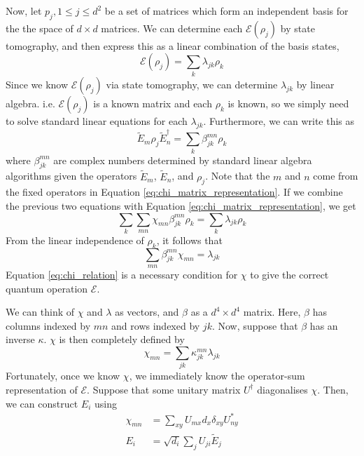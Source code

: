 Now, let $p_j, 1 \le j \le d^2$ be a set of matrices which form an independent basis for the the
space of $d \times d$ matrices. We can determine each $\mathcal{E}(\rho_j)$ by state tomography, and
then express this as a linear combination of the basis states,
\begin{equation}
    \mathcal{E}(\rho_j) = \sum_k \lambda_{jk} \rho_k
\end{equation}
Since we know $\mathcal{E}(\rho_j)$ via state tomography, we can determine $\lambda_{jk}$ by linear
algebra. i.e. $\mathcal{E}(\rho_j)$ is a known matrix and each $\rho_k$ is known, so we simply need
to solve standard linear equations for each $\lambda_{jk}$. Furthermore, we can write this as
\begin{equation}
    \tilde{E}_m \rho_j \tilde{E}_n^{\dagger} = \sum_k \beta_{jk}^{mn} \rho_k
\end{equation}
where $\beta_{jk}^{mn}$ are complex numbers determined by standard linear algebra algorithms given
the operators $\tilde{E}_m$, $\tilde{E}_n$, and $\rho_j$. Note that the $m$ and $n$ come from the fixed operators in
Equation \ref{eq:chi_matrix_representation}. If we combine the previous two equations with Equation
\ref{eq:chi_matrix_representation}, we get
\begin{equation}
    \sum_k \sum_{mn} \chi_{mn} \beta_{jk}^{mn} \rho_k = \sum_k \lambda_{jk} \rho_k
\end{equation}
From the linear independence of $\rho_k$, it follows that
\begin{equation} \label{eq:chi_relation}
    \sum_{mn} \beta_{jk}^{mn} \chi_{mn} = \lambda_{jk}
\end{equation}
Equation \ref{eq:chi_relation} is a necessary condition for $\chi$ to give the correct quantum
operation $\mathcal{E}$.

We can think of $\chi$ and $\lambda$ as vectors, and $\beta$ as a $d^4 \times d^4$ matrix. Here,
$\beta$ has columns indexed by $mn$ and rows indexed by $jk$. Now, suppose that $\beta$ has an
inverse $\kappa$. $\chi$ is then completely defined by
\begin{equation}
    \chi_{mn} = \sum_{jk} \kappa_{jk}^{mn} \lambda_{jk}
\end{equation}
Fortunately, once we know $\chi$, we immediately know the operator-sum representation of
$\mathcal{E}$. Suppose that some unitary matrix $U^{\dagger}$ diagonalises $\chi$. Then, we can
construct $E_i$ using
\begin{align}
    \chi_{mn} &= \sum_{xy} U_{mx} d_x \delta_{xy} U^*_{ny} \\
    E_i &= \sqrt{d_i} \sum_j U_{ji} \tilde{E}_j
\end{align}


